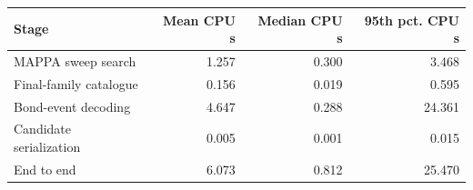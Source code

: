 \begin{tabular}{@{}lrrr@{}}\toprule
Stage & Mean CPU s & Median CPU s & 95th pct. CPU s\\\midrule
MAPPA sweep search & 1.257 & 0.300 & 3.468\\
Final-family catalogue & 0.156 & 0.019 & 0.595\\
Bond-event decoding & 4.647 & 0.288 & 24.361\\
Candidate serialization & 0.005 & 0.001 & 0.015\\
End to end & 6.073 & 0.812 & 25.470\\
\bottomrule\end{tabular}
